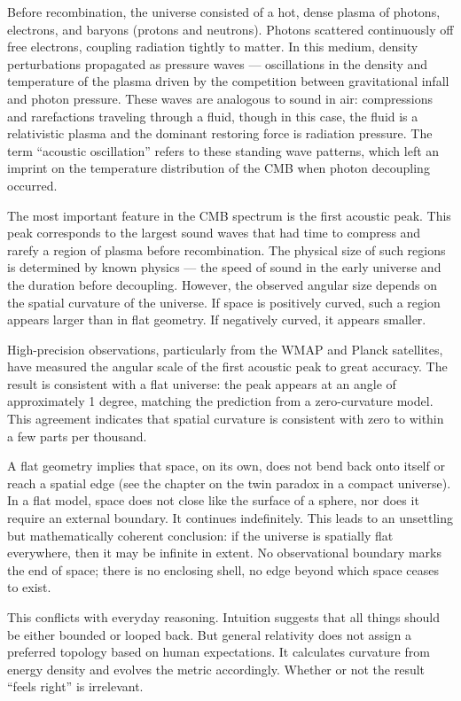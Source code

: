 Before recombination, the universe consisted of a hot, dense plasma of photons, electrons, and baryons (protons and neutrons). Photons scattered continuously off free electrons, coupling radiation tightly to matter. In this medium, density perturbations propagated as pressure waves — oscillations in the density and temperature of the plasma driven by the competition between gravitational infall and photon pressure. These waves are analogous to sound in air: compressions and rarefactions traveling through a fluid, though in this case, the fluid is a relativistic plasma and the dominant restoring force is radiation pressure. The term “acoustic oscillation” refers to these standing wave patterns, which left an imprint on the temperature distribution of the CMB when photon decoupling occurred.

The most important feature in the CMB spectrum is the first acoustic peak. This peak corresponds to the largest sound waves that had time to compress and rarefy a region of plasma before recombination. The physical size of such regions is determined by known physics — the speed of sound in the early universe and the duration before decoupling. However, the observed angular size depends on the spatial curvature of the universe. If space is positively curved, such a region appears larger than in flat geometry. If negatively curved, it appears smaller.

High-precision observations, particularly from the WMAP and Planck satellites, have measured the angular scale of the first acoustic peak to great accuracy. The result is consistent with a flat universe: the peak appears at an angle of approximately 1 degree, matching the prediction from a zero-curvature model. This agreement indicates that spatial curvature is consistent with zero to within a few parts per thousand.

A flat geometry implies that space, on its own, does not bend back onto itself or reach a spatial edge (see the chapter on the twin paradox in a compact universe). In a flat model, space does not close like the surface of a sphere, nor does it require an external boundary. It continues indefinitely. This leads to an unsettling but mathematically coherent conclusion: if the universe is spatially flat everywhere, then it may be infinite in extent. No observational boundary marks the end of space; there is no enclosing shell, no edge beyond which space ceases to exist.

This conflicts with everyday reasoning. Intuition suggests that all things should be either bounded or looped back. But general relativity does not assign a preferred topology based on human expectations. It calculates curvature from energy density and evolves the metric accordingly. Whether or not the result “feels right” is irrelevant.


